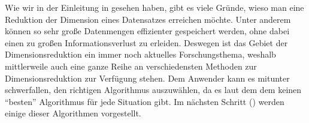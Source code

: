 Wie wir in der Einleitung in  gesehen haben, gibt es viele Gründe, wieso man
eine Reduktion der Dimension eines Datensatzes erreichen möchte. Unter anderem können so sehr große
Datenmengen effizienter gespeichert werden, ohne dabei einen zu großen Informationsverlust zu
erleiden. Deswegen ist das Gebiet der Dimensionsreduktion ein immer noch aktuelles Forschungsthema,
weshalb mittlerweile auch eine ganze Reihe an verschiedensten Methoden zur Dimensionsreduktion zur
Verfügung stehen. Dem Anwender kann es mitunter schwerfallen, den richtigen Algorithmus
auszuwählen, da es laut dem dem  \parencite{Wolpert.1997} keinen \enquote{besten} Algorithmus für jede Situation gibt. Im nächsten
Schritt () werden einige dieser Algorithmen vorgestellt.